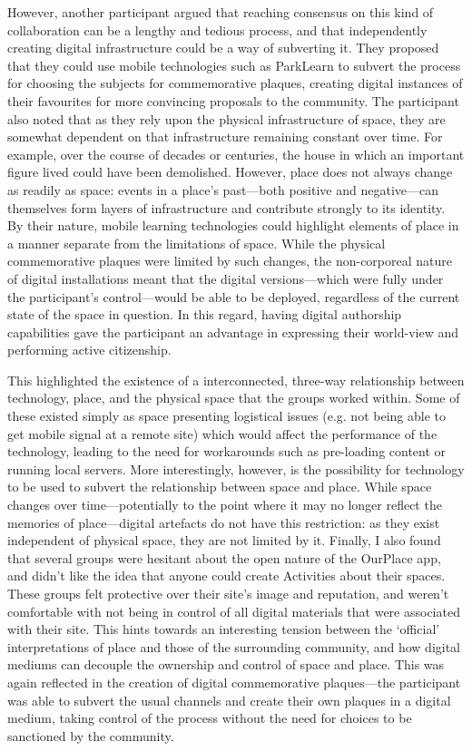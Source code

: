 However, another participant argued that reaching consensus on this kind of collaboration can be a lengthy and tedious process, and that independently creating digital infrastructure could be a way of subverting it. They proposed that they could use mobile technologies such as ParkLearn to subvert the process for choosing the subjects for commemorative plaques, creating digital instances of their favourites for more convincing proposals to the community. The participant also noted that as they rely upon the physical infrastructure of space, they are somewhat dependent on that infrastructure remaining constant over time. For example, over the course of decades or centuries, the house in which an important figure lived could have been demolished. However, place does not always change as readily as space: events in a place's past---both positive and negative---can themselves form layers of infrastructure and contribute strongly to its identity. By their nature, mobile learning technologies could highlight elements of place in a manner separate from the limitations of space. While the physical commemorative plaques were limited by such changes, the non-corporeal nature of digital installations meant that the digital versions---which were fully under the participant's control---would be able to be deployed, regardless of the current state of the space in question. In this regard, having digital authorship capabilities gave the participant an advantage in expressing their world-view and performing active citizenship.

This highlighted the existence of a interconnected, three-way relationship between technology, place, and the physical space that the groups worked within. Some of these existed simply as space presenting logistical issues (e.g. not being able to get mobile signal at a remote site) which would affect the performance of the technology, leading to the need for workarounds such as pre-loading content or running local servers. More interestingly, however, is the possibility for technology to be used to subvert the relationship between space and place. While space changes over time---potentially to the point where it may no longer reflect the memories of place---digital artefacts do not have this restriction: as they exist independent of physical space, they are not limited by it. Finally, I also found that several groups were hesitant about the open nature of the OurPlace app, and didn't like the idea that anyone could create Activities about their spaces. These groups felt protective over their site's image and reputation, and weren't comfortable with not being in control of all digital materials that were associated with their site. This hints towards an interesting tension between the `official' interpretations of place and those of the surrounding community, and how digital mediums can decouple the ownership and control of space and place. This was again reflected in the creation of digital commemorative plaques---the participant was able to subvert the usual channels and create their own plaques in a digital medium, taking control of the process without the need for choices to be sanctioned by the community.  

